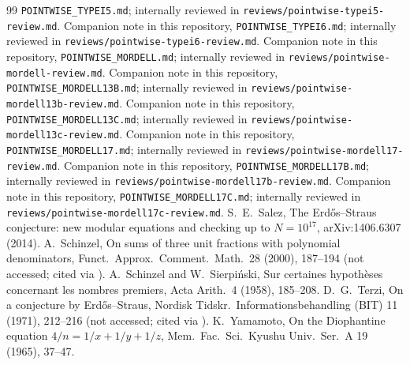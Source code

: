 \documentclass[11pt,reqno]{amsart}
\theoremstyle{definition}
\begin{document}
\begin{thebibliography}{99}
\texttt{POINTWISE\_TYPEI5.md}; internally reviewed in
\texttt{reviews/pointwise-typei5-review.md}.
 Companion note in this repository,
\texttt{POINTWISE\_TYPEI6.md}; internally reviewed in
\texttt{reviews/pointwise-typei6-review.md}.
 Companion note in this repository,
\texttt{POINTWISE\_MORDELL.md}; internally reviewed in
\texttt{reviews/pointwise-mordell-review.md}.
 Companion note in this repository,
\texttt{POINTWISE\_MORDELL13B.md}; internally reviewed in
\texttt{reviews/pointwise-mordell13b-review.md}.
 Companion note in this repository,
\texttt{POINTWISE\_MORDELL13C.md}; internally reviewed in
\texttt{reviews/pointwise-mordell13c-review.md}.
 Companion note in this repository,
\texttt{POINTWISE\_MORDELL17.md}; internally reviewed in
\texttt{reviews/pointwise-mordell17-review.md}.
 Companion note in this repository,
\texttt{POINTWISE\_MORDELL17B.md}; internally reviewed in
\texttt{reviews/pointwise-mordell17b-review.md}.
 Companion note in this repository,
\texttt{POINTWISE\_MORDELL17C.md}; internally reviewed in
\texttt{reviews/pointwise-mordell17c-review.md}.
 S.~E.~Salez, The Erd\H{o}s--Straus conjecture: new modular
equations and checking up to $N=10^{17}$, arXiv:1406.6307 (2014).
 A.~Schinzel, On sums of three unit fractions with
polynomial denominators, Funct.\ Approx.\ Comment.\ Math.\ 28 (2000),
187--194 (not accessed; cited via \cite{ET}).
 A.~Schinzel and W.~Sierpi\'nski, Sur certaines hypoth\`eses
concernant les nombres premiers, Acta Arith.\ 4 (1958), 185--208.
 D.~G.~Terzi, On a conjecture by Erd\H{o}s--Straus,
Nordisk Tidskr.\ Informationsbehandling (BIT) 11 (1971), 212--216 (not
accessed; cited via \cite{IW}).
 K.~Yamamoto, On the Diophantine equation
$4/n=1/x+1/y+1/z$, Mem.\ Fac.\ Sci.\ Kyushu Univ.\ Ser.\ A 19 (1965), 37--47.
\end{thebibliography}
\end{document}
